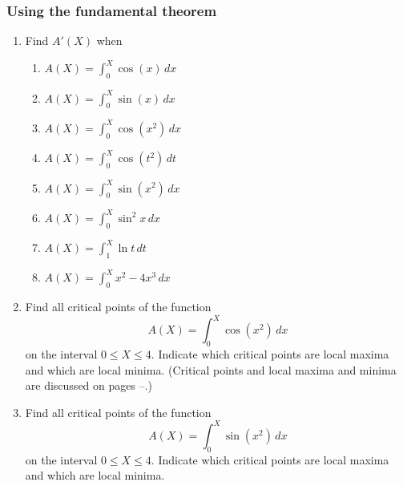 \subsubsection{Using the fundamental theorem}
\label{subsubsec:using-the-fundamental-theorem}



\begin{enumerate}
\item Find $A'(X)$ when





  \begin{enumerate}
  \item $A(X) = {\displaystyle \int_0^X \cos(x) \, dx}$


  \item $A(X) = {\displaystyle \int_0^X \sin(x) \, dx}$


  \item $A(X) = {\displaystyle \int_0^X \cos(x^2) \, dx}$


  \item $A(X) = {\displaystyle \int_0^X \cos(t^2) \, dt}$


  \item $A(X) = {\displaystyle \int_0^X \sin(x^2) \, dx}$


  \item $A(X) = {\displaystyle \int_0^X \sin^2{x} \, dx}$


  \item $A(X) = {\displaystyle \int_1^X \ln{t} \, dt}$


  \item $A(X) = {\displaystyle \int_0^X x^2-4x^3 \, dx}$
\mbox{}



\end{enumerate}
\item Find all critical points of the function
\[
A(X) = \int_0^X \cos(x^2) \, dx
\]
on the interval $0 \leq X \leq 4$.  Indicate which critical points are
local maxima and which are local minima.  (Critical points and local
maxima and minima are discussed on pages
\pageref{crit-begin}--\pageref{crit-end}.)




\item Find all critical points of the function
	\[
A(X) = \int_0^X \sin(x^2) \, dx
\]
on the interval $0 \leq X \leq 4$.  Indicate which critical points are local maxima and which are local minima.  



\end{enumerate}
